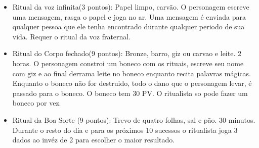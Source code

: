 \begin{itemize}
 	\item Ritual da voz infinita(3 pontos): Papel limpo, carvão. O personagem escreve uma mensagem, rasga o papel e joga no ar. Uma mensagem é enviada para qualquer pessoa que ele tenha encontrado durante qualquer periodo de sua vida. Requer o ritual da voz fraternal.
 
 	\item Ritual do Corpo fechado(9 pontos): Bronze, barro, giz ou carvao e leite. 2 horas. O personagem constroi um boneco com os rituais, escreve seu nome com giz e ao final derrama leite no boneco enquanto recita palavras mágicas. Enquanto o boneco não for destruido, todo o dano que o personagem levar, é passado para o boneco. O boneco tem 30 PV. O ritualista so pode fazer um boneco por vez.
 
 	\item Ritual da Boa Sorte (9 pontos): Trevo de quatro folhas, sal e pão. 30 minutos. Durante o resto do dia e para os próximos 10 sucessos o ritualista joga 3 dados ao invéz de 2 para escolher o maior resultado.
\end{itemize}
 
